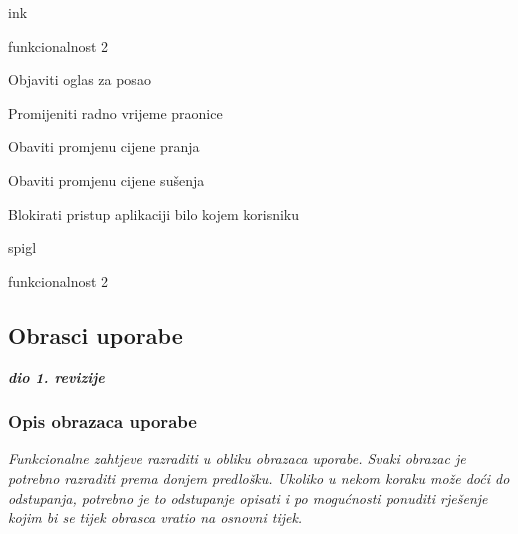 \begin{packed_enum}
\begin{packed_enum}
		\item ink
		\item funkcionalnost 2
		
	\end{packed_enum}
	
	\item  {}
	
	\begin{packed_enum}
		
		\item Objaviti oglas za posao
		\item Promijeniti radno vrijeme praonice
		\item Obaviti promjenu cijene pranja
		\item Obaviti promjenu cijene sušenja
		\item Blokirati pristup aplikaciji bilo kojem korisniku
		
	\end{packed_enum}
	
	\item  {}
	
	\begin{packed_enum}
		
		\item spigl
		\item funkcionalnost 2
		
	\end{packed_enum}
	
\end{packed_enum}

\eject 



\subsection{Obrasci uporabe}

\textbf{\textit{dio 1. revizije}}

\subsubsection{Opis obrazaca uporabe}
\textit{Funkcionalne zahtjeve razraditi u obliku obrazaca uporabe. Svaki obrazac je potrebno razraditi prema donjem predlošku. Ukoliko u nekom koraku može doći do odstupanja, potrebno je to odstupanje opisati i po mogućnosti ponuditi rješenje kojim bi se tijek obrasca vratio na osnovni tijek.}\\



